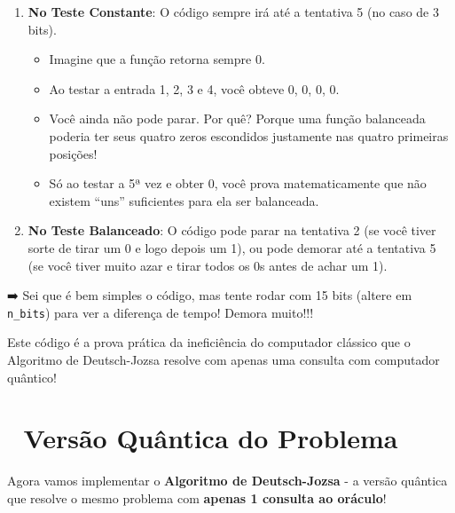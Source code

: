 \documentclass[
  brazilian,
]{report}
\providecommand{\tightlist}{%
  \setlength{\itemsep}{0pt}\setlength{\parskip}{0pt}}
\begin{document}
\begin{enumerate}
\def\labelenumi{\arabic{enumi}.}
\item
  \textbf{No Teste Constante}: O código sempre irá até a tentativa 5 (no
  caso de 3 bits).

  \begin{itemize}
  \tightlist
  \item
    Imagine que a função retorna sempre 0.
  \item
    Ao testar a entrada 1, 2, 3 e 4, você obteve 0, 0, 0, 0.
  \item
    Você ainda não pode parar. Por quê? Porque uma função balanceada
    poderia ter seus quatro zeros escondidos justamente nas quatro
    primeiras posições!
  \item
    Só ao testar a 5ª vez e obter 0, você prova matematicamente que não
    existem ``uns'' suficientes para ela ser balanceada.
  \end{itemize}
\item
  \textbf{No Teste Balanceado}: O código pode parar na tentativa 2 (se
  você tiver sorte de tirar um 0 e logo depois um 1), ou pode demorar
  até a tentativa 5 (se você tiver muito azar e tirar todos os 0s antes
  de achar um 1).
\end{enumerate}

➡️ Sei que é bem simples o código, mas tente rodar com 15 bits (altere
em \texttt{n\_bits}) para ver a diferença de tempo! Demora muito!!!

Este código é a prova prática da ineficiência do computador clássico que
o Algoritmo de Deutsch-Jozsa resolve com apenas uma consulta com
computador quântico!

\section{🚀 Versão Quântica do
Problema}\label{versuxe3o-quuxe2ntica-do-problema}

Agora vamos implementar o \textbf{Algoritmo de Deutsch-Jozsa} - a versão
quântica que resolve o mesmo problema com \textbf{apenas 1 consulta ao
oráculo}!
\end{document}
